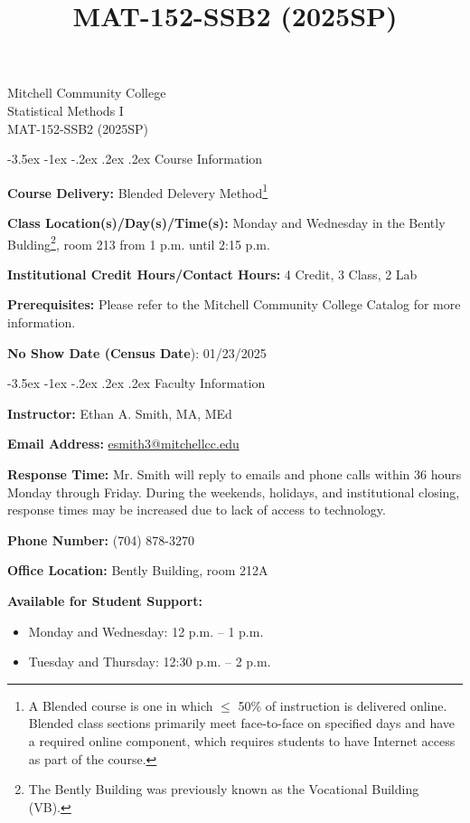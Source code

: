 \documentclass{article}
\title{MAT-152-SSB2 (2025SP)}
\makeatletter
\renewcommand\section{\@startsection{section}{1}{0pt}%
  {-3.5ex \@plus -1ex \@minus -.2ex}%
  {.2ex \@plus.2ex}%
  {\normalfont\Large\bfseries}} %
\makeatother
\begin{document}
\begin{center}
    {\huge Mitchell Community College} \\[6pt]
    {\Large Statistical Methods I} \\[6pt]
    {\Large MAT-152-SSB2 (2025SP)}
\end{center}

\section{Course Information}

\textbf{Course Delivery:} Blended Delevery Method\footnote{A Blended course is one in which $\leq$ 50\% of instruction is delivered online. Blended class sections primarily meet face-to-face on specified days and have a required online component, which requires students to have Internet access as part of the course.}

\textbf{Class Location(s)/Day(s)/Time(s):} Monday and Wednesday in the Bently Bulding\footnote{The Bently Building was previously known as the Vocational Building (VB).}, room 213 from 1 p.m. until 2:15 p.m.

\textbf{Institutional Credit Hours/Contact Hours:} 4 Credit, 3 Class, 2 Lab

\textbf{Prerequisites:} Please refer to the Mitchell Community College Catalog for more information.

\textbf{No Show Date (Census Date}): 01/23/2025

\section{Faculty Information}

\textbf{Instructor:} Ethan A. Smith, MA, MEd

\textbf{Email Address:} \href{mailto:esmith3@mitchellcc.edu}{esmith3@mitchellcc.edu}

\textbf{Response Time:} Mr. Smith will reply to emails and phone calls within 36 hours Monday through Friday. During the weekends, holidays, and institutional closing, response times may be increased due to lack of access to technology.

\textbf{Phone Number:} (704) 878-3270

\textbf{Office Location:} Bently Building, room 212A

\textbf{Available for Student Support:}

\begin{itemize}
\item Monday and Wednesday: 12 p.m. -- 1 p.m.
\item Tuesday and Thursday: 12:30 p.m. -- 2 p.m.
\end{itemize}
\end{document}
